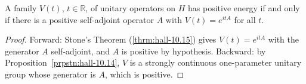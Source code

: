 \begin{theorem}
    \label{thrm:positive-energy-iff-exp}
    \leanok
    A family $V(t)$, $t \in \mathbb{R}$, of unitary operators on $H$ has positive energy if and only if there is a positive self-adjoint operator $A$ with $V(t) = e^{itA}$ for all $t$.
\end{theorem}
\begin{proof}
    \leanok
    Forward: Stone's Theorem (\ref{thrm:hall-10.15}) gives $V(t) = e^{itA}$ with the generator $A$ self-adjoint, and $A$ is positive by hypothesis. Backward: by Proposition~\ref{prpstn:hall-10.14}, $V$ is a strongly continuous one-parameter unitary group whose generator is $A$, which is positive.
\end{proof}

